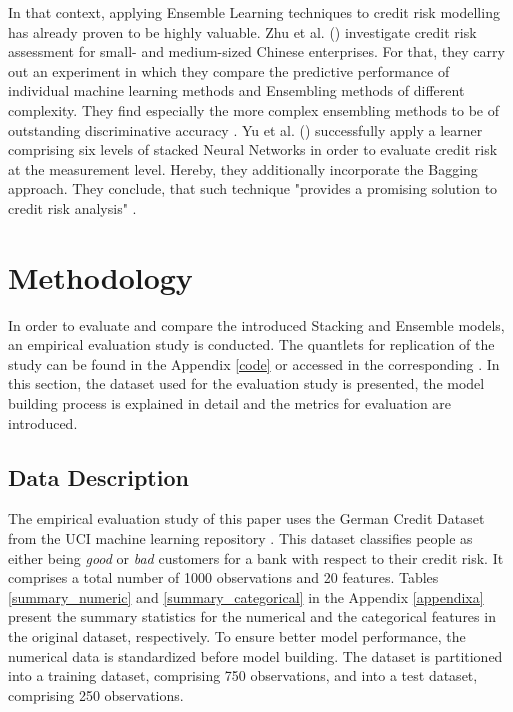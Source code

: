 \documentclass[12pt]{article}
\begin{document}
In that context, applying Ensemble Learning techniques to credit risk modelling has already proven to be highly valuable. Zhu et al. (\citeyear{zhu2017comparison}) investigate credit risk assessment for small- and medium-sized Chinese enterprises. For that, they carry out an experiment in which they compare the predictive performance of individual machine learning methods and Ensembling methods of different complexity. They find especially the more complex ensembling methods to be of outstanding discriminative accuracy \citep[p.46f.]{zhu2017comparison}. Yu et al. (\citeyear{yu2008credit}) successfully apply a learner comprising six levels of stacked Neural Networks in order to evaluate credit risk at the measurement level. Hereby, they additionally incorporate the Bagging approach. They conclude, that such technique "provides a promising solution to credit risk analysis" \citep[p.1443]{yu2008credit}. 




\section{Methodology}\label{method}
In order to evaluate and compare the introduced Stacking and Ensemble models, an empirical evaluation study is conducted. The quantlets for replication of the study can be found in the Appendix \ref{code} or accessed in the corresponding \href{https://github.com/schreckf/NIC_Schreck}{\color{black}{github repository}}. In this section, the dataset used for the evaluation study is presented, the model building process is explained in detail and the metrics for evaluation are introduced.

\subsection{Data Description}
The empirical evaluation study of this paper uses the German Credit Dataset from the UCI machine learning repository \citep{dataset}. This dataset classifies people as either being \textit{good} or \textit{bad} customers for a bank with respect to their credit risk. It comprises a total number of 1000 observations and 20 features. Tables \ref{summary_numeric} and \ref{summary_categorical} in the Appendix \ref{appendixa} present the summary statistics for the numerical and the categorical features in the original dataset, respectively. To ensure better model performance, the numerical data is standardized before model building. The dataset is partitioned into a training dataset, comprising 750 observations, and into a test dataset, comprising 250 observations.
\end{document}
